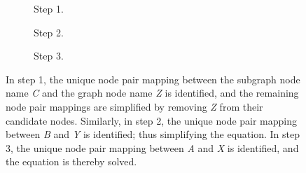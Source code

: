 \begin{figure}[htbp]
	\centering
	\begin{subfigure}[t]{0.30\textwidth}
		
		\caption{Step 1.}
	\end{subfigure}
	\enskip
	\begin{subfigure}[t]{0.23\textwidth}
		
		\caption{Step 2.}
	\end{subfigure}
	\enskip
	\begin{subfigure}[t]{0.17\textwidth}
		
		\caption{Step 3.}
	\end{subfigure}
	\caption{In step 1, the unique node pair mapping between the subgraph node name \textit{C} and the graph node name \textit{Z} is identified, and the remaining node pair mappings are simplified by removing \textit{Z} from their candidate nodes. Similarly, in step 2, the unique node pair mapping between \textit{B} and \textit{Y} is identified; thus simplifying the equation. In step 3, the unique node pair mapping between \textit{A} and \textit{X} is identified, and the equation is thereby solved.}
	\label{fig:unique_equation_solver}
\end{figure}


